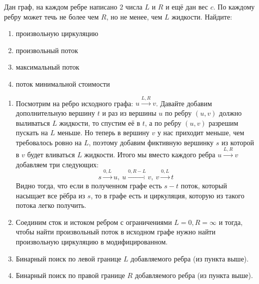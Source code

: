 \begin{task}[4]
Дан граф, на каждом ребре написано $2$ числа $L$ и $R$ и ещё дан вес $c$. По каждому ребру может течь не более чем $R$, но не менее, чем $L$ жидкости. Найдите:
	\begin{enumerate}
		\item произвольную циркуляцию
		\item произвольный поток
		\item максимальный поток
		\item поток минимальной стоимости
	\end{enumerate}
\end{task}
\begin{solution}
\begin{enumerate}
	\item Посмотрим на ребро исходного графа: $u \stackrel{L, R}{\longrightarrow} v$. Давайте добавим дополнительную вершину $t$ и раз из вершины $u$ по ребру $(u, v)$ должно выливаться $L$ жидкости, то спустим её в $t$, а по ребру $(u, v)$ разрешим пускать на $L$ меньше. Но теперь в вершину $v$ у нас приходит меньше, чем требовалось ровно на $L$, поэтому добавим фиктивную вершинку $s$ из которой в $v$ будет вливаться $L$ жидкости. Итого мы вместо каждого ребра $u \stackrel{L, R}{\longrightarrow} v$ добавляем три следующих:
	\[
		s \stackrel{0, L}{\longrightarrow} u,\ u \stackrel{0, R-L}{\longrightarrow} v,\ v \stackrel{0, L}{\longrightarrow} t
	\]
	Видно тогда, что если в полученном графе есть $s-t$ поток, который насыщает все рёбра из $s$, то в графе есть и циркуляция, которую из такого потока легко получить.
	\item Соединим сток и истоком ребром с ограничениями $L = 0, R = \infty$ и тогда, чтобы найти произвольный поток в исходном графе нужно найти произвольную циркуляцию в модифицированном.
	\item Бинарный поиск по левой границе $L$ добавляемого ребра (из пункта выше).
	\item Бинарный поиск по правой границе $R$ добавляемого ребра (из пункта выше).
\end{enumerate}
\end{solution}

